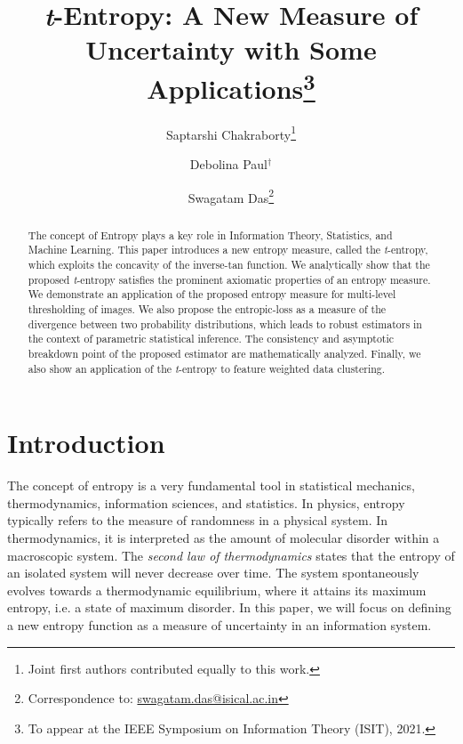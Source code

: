 \documentclass{article}
\title{\textit{t}-Entropy: A New Measure of Uncertainty with Some Applications\thanks{To appear at the IEEE Symposium on Information Theory (ISIT), 2021.}}
\author[1]{Saptarshi Chakraborty\thanks{Joint first authors contributed equally to this work.}}
\author[2]{Debolina Paul$^\dagger$}
\author[3]{Swagatam Das\thanks{Correspondence to: \href{mailto:swagatam.das@isical.ac.in}{swagatam.das@isical.ac.in}}}
\affil[1]{Department of Statistics, University of California, Berkeley}
\affil[2]{Indian Statistical Institute, Kolkata, India}
\affil[3]{Electronics and Communication Sciences Unit, Indian Statistical Institute, Kolkata, India}
\date{\vspace{-5ex}}
\begin{document}
\maketitle

\begin{abstract}
   The concept of Entropy plays a key role in Information Theory, Statistics, and  Machine Learning. This paper introduces a new entropy measure, called the \textit{t}-entropy, which exploits the concavity of the inverse-tan function. We analytically show that the proposed \textit{t}-entropy satisfies the prominent axiomatic properties of an entropy measure. We demonstrate an application of the proposed entropy measure for multi-level thresholding of images. We also propose the entropic-loss as a measure of the divergence between two probability distributions, which leads to robust estimators in the context of parametric statistical inference. The consistency and asymptotic breakdown point of the proposed estimator are mathematically analyzed.  Finally, we also show an application of the \textit{t}-entropy to feature weighted data clustering.
\end{abstract}


\section{Introduction}
 The concept of entropy is a very fundamental tool in statistical mechanics, thermodynamics, information sciences, and statistics. In physics, entropy typically refers to the measure of randomness in a physical system. In thermodynamics, it is interpreted as the amount of molecular disorder within a macroscopic system. The \textit{second law of thermodynamics} states that the entropy of an isolated system will never decrease over time. The system spontaneously evolves towards a thermodynamic equilibrium, where it attains its maximum entropy, i.e. a state of maximum disorder. In this paper, we will focus on defining a new entropy function as a measure of uncertainty in an information system.
   
\end{document}
